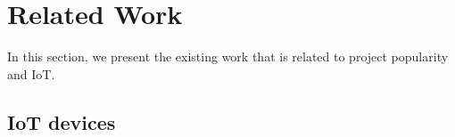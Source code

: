 \section{Related Work}\label{section:relatedWork}
\begin{comment}
\end{comment}

In this section, we present the existing work that is related to project
popularity and IoT. 

\subsection{IoT devices}


